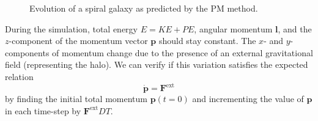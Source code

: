 \begin{figure}[htp]
    \caption{Evolution of a spiral galaxy as predicted by the PM method.}
    \label{fig:spiral-galaxy-evolution-pm}
\end{figure}

During the simulation, total energy $E = KE + PE$, angular momentum $\mathbf{l}$, and the $z$-component of the momentum vector $\mathbf{p}$ should stay constant.
The $x$- and $y$-components of momentum change due to the presence of an external gravitational field (representing the halo).
We can verify if this variation satisfies the expected relation
\begin{equation}\label{eq:expected-momentum-change}
    \dot{\mathbf{p}} = \mathbf{F}^\text{ext}
\end{equation}
by finding the initial total momentum $\mathbf{p}(t = 0)$ and incrementing the value of $\mathbf{p}$ in each time-step by $\mathbf{F}^\text{ext}DT$.

